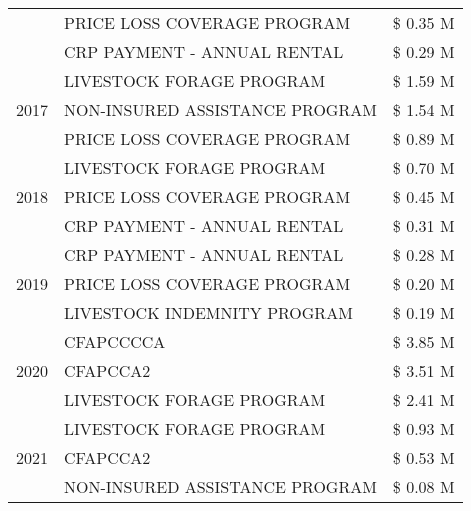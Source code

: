 \begin{tabular}{llr}
 & PRICE LOSS COVERAGE PROGRAM & \$ 0.35 M \\
 & CRP PAYMENT - ANNUAL RENTAL & \$ 0.29 M \\
\cline{1-3}
\multirow[t]{3}{*}{2017} & LIVESTOCK FORAGE PROGRAM & \$ 1.59 M \\
 & NON-INSURED ASSISTANCE PROGRAM & \$ 1.54 M \\
 & PRICE LOSS COVERAGE PROGRAM & \$ 0.89 M \\
\cline{1-3}
\multirow[t]{3}{*}{2018} & LIVESTOCK FORAGE PROGRAM & \$ 0.70 M \\
 & PRICE LOSS COVERAGE PROGRAM & \$ 0.45 M \\
 & CRP PAYMENT - ANNUAL RENTAL & \$ 0.31 M \\
\cline{1-3}
\multirow[t]{3}{*}{2019} & CRP PAYMENT - ANNUAL RENTAL & \$ 0.28 M \\
 & PRICE LOSS COVERAGE PROGRAM & \$ 0.20 M \\
 & LIVESTOCK INDEMNITY PROGRAM & \$ 0.19 M \\
\cline{1-3}
\multirow[t]{3}{*}{2020} & CFAPCCCCA & \$ 3.85 M \\
 & CFAPCCA2 & \$ 3.51 M \\
 & LIVESTOCK FORAGE PROGRAM & \$ 2.41 M \\
\cline{1-3}
\multirow[t]{3}{*}{2021} & LIVESTOCK FORAGE PROGRAM & \$ 0.93 M \\
 & CFAPCCA2 & \$ 0.53 M \\
 & NON-INSURED ASSISTANCE PROGRAM & \$ 0.08 M \\
\cline{1-3}
\bottomrule
\end{tabular}
